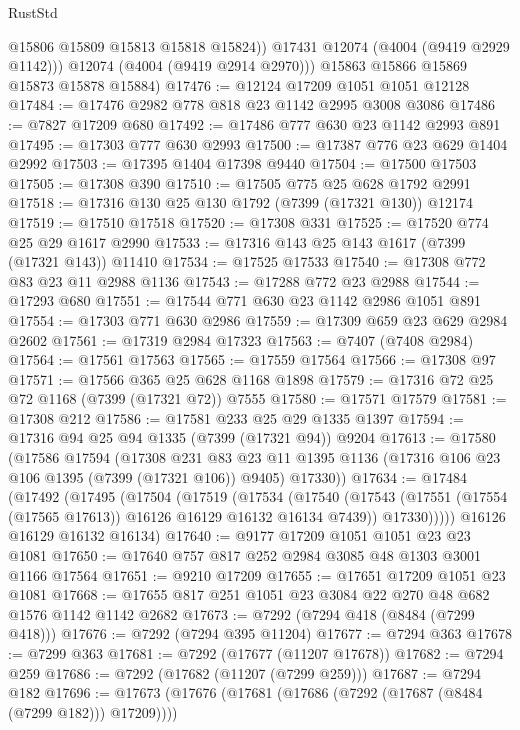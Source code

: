 \begin{lexlean}{RustStd}
\begin{coremodule}
              @15806
              @15809
              @15813
              @15818
              @15824))
          @17431
          @12074
          (@4004 (@9419 @2929 @1142)))
        @12074
        (@4004 (@9419 @2914 @2970)))
      @15863
      @15866
      @15869
      @15873
      @15878
      @15884)
@17476 := @12124 @17209 @1051 @1051 @12128
@17484 := @17476 @2982 @778 @818 @23 @1142 @2995 @3008 @3086
@17486 := @7827 @17209 @680
@17492 := @17486 @777 @630 @23 @1142 @2993 @891
@17495 := @17303 @777 @630 @2993
@17500 := @17387 @776 @23 @629 @1404 @2992
@17503 := @17395 @1404 @17398 @9440
@17504 := @17500 @17503
@17505 := @17308 @390
@17510 := @17505 @775 @25 @628 @1792 @2991
@17518 := @17316 @130 @25 @130 @1792 (@7399 (@17321 @130)) @12174
@17519 := @17510 @17518
@17520 := @17308 @331
@17525 := @17520 @774 @25 @29 @1617 @2990
@17533 := @17316 @143 @25 @143 @1617 (@7399 (@17321 @143)) @11410
@17534 := @17525 @17533
@17540 := @17308 @772 @83 @23 @11 @2988 @1136
@17543 := @17288 @772 @23 @2988
@17544 := @17293 @680
@17551 := @17544 @771 @630 @23 @1142 @2986 @1051 @891
@17554 := @17303 @771 @630 @2986
@17559 := @17309 @659 @23 @629 @2984 @2602
@17561 := @17319 @2984 @17323
@17563 := @7407 (@7408 @2984)
@17564 := @17561 @17563
@17565 := @17559 @17564
@17566 := @17308 @97
@17571 := @17566 @365 @25 @628 @1168 @1898
@17579 := @17316 @72 @25 @72 @1168 (@7399 (@17321 @72)) @7555
@17580 := @17571 @17579
@17581 := @17308 @212
@17586 := @17581 @233 @25 @29 @1335 @1397
@17594 := @17316 @94 @25 @94 @1335 (@7399 (@17321 @94)) @9204
@17613 := @17580
    (@17586
      @17594
      (@17308
        @231
        @83
        @23
        @11
        @1395
        @1136
        (@17316 @106 @23 @106 @1395 (@7399 (@17321 @106)) @9405)
        @17330))
@17634 := @17484
    (@17492
      (@17495
        (@17504
          (@17519
            (@17534
              (@17540
                (@17543 (@17551 (@17554 (@17565 @17613)) @16126 @16129 @16132 @16134 @7439))
                @17330)))))
      @16126
      @16129
      @16132
      @16134)
@17640 := @9177 @17209 @1051 @1051 @23 @23 @1081
@17650 := @17640 @757 @817 @252 @2984 @3085 @48 @1303 @3001 @1166 @17564
@17651 := @9210 @17209
@17655 := @17651 @17209 @1051 @23 @1081
@17668 := @17655 @817 @251 @1051 @23 @3084 @22 @270 @48 @682 @1576 @1142 @1142 @2682
@17673 := @7292 (@7294 @418 (@8484 (@7299 @418)))
@17676 := @7292 (@7294 @395 @11204)
@17677 := @7294 @363
@17678 := @7299 @363
@17681 := @7292 (@17677 (@11207 @17678))
@17682 := @7294 @259
@17686 := @7292 (@17682 (@11207 (@7299 @259)))
@17687 := @7294 @182
@17696 := @17673 (@17676 (@17681 (@17686 (@7292 (@17687 (@8484 (@7299 @182))) @17209))))

\end{coremodule}
\end{lexlean}

